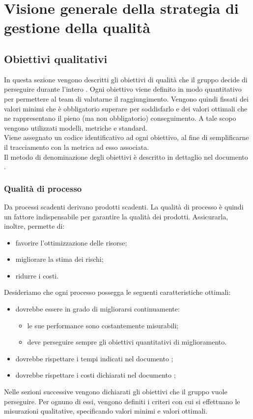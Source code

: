 \documentclass[PianoDiQualifica.tex]{subfiles}
\begin{document}
\section{Visione generale della strategia di gestione della qualità}
	\subsection{Obiettivi qualitativi}
		In questa sezione vengono descritti gli obiettivi di qualità che il gruppo \GRUPPO{} decide di perseguire durante l'intero .
		Ogni obiettivo viene definito in modo quantitativo per permettere al team di valutarne il raggiungimento.
		Vengono quindi fissati dei valori minimi che è obbligatorio superare per soddisfarlo e dei valori ottimali che ne rappresentano il pieno (ma non obbligatorio) conseguimento.
		A tale scopo vengono utilizzati modelli, metriche e standard. \\
		Viene assegnato un codice identificativo ad ogni obiettivo, al fine di semplificarne il tracciamento con la metrica ad esso associata. \\
		Il metodo di denominazione degli obiettivi è descritto in dettaglio nel documento \NPdocRR{}.

		\subsubsection{Qualità di processo}
		Da processi scadenti derivano prodotti scadenti. La qualità di processo è quindi un fattore indispensabile per garantire la qualità dei prodotti. Assicurarla, inoltre, permette di:
		\begin{itemize}
			\item favorire l'ottimizzazione delle risorse;
			\item migliorare la stima dei rischi;
			\item ridurre i costi.
		\end{itemize}
		Desideriamo che ogni processo possegga le seguenti caratteristiche ottimali:
		\begin{itemize}
			\item dovrebbe essere in grado di migliorarsi continuamente:
			\begin{itemize}
					\item le sue performance sono costantemente misurabili;
					\item deve perseguire sempre gli obiettivi quantitativi di miglioramento.
			\end{itemize}
			\item dovrebbe rispettare i tempi indicati nel documento \PPdocRR;
			\item dovrebbe rispettare i costi dichiarati nel documento \PPdocRR;
		\end{itemize}
		Nelle sezioni successive vengono dichiarati gli obiettivi che il gruppo vuole perseguire. Per ognuno di essi, vengono definiti i criteri con cui si effettuano le misurazioni qualitative,
		specificando valori minimi e valori ottimali.
\end{document}
